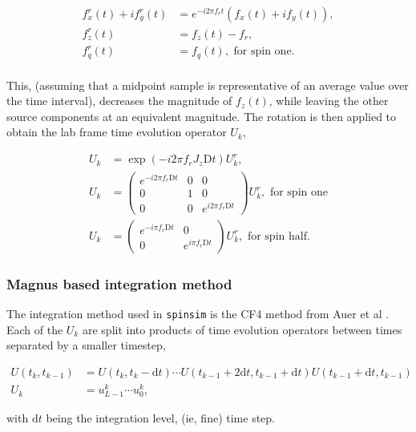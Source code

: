 \documentclass{jors}
\begin{document}
			\begin{align*}
				f^r_x(t) + if^r_y(t) &= e^{-i 2\pi f_r t}(f_x(t) + if_y(t)),\\
				f^r_z(t) &= f_z(t) - f_r,\\
				f^r_q(t) &= f_q(t), \textrm{ for spin one.}\\
			\end{align*}
			
			This, (assuming that a midpoint sample is representative of an average value over the time interval), decreases the magnitude of \(f_z(t)\), while leaving the other source components at an equivalent magnitude. The rotation is then applied to obtain the lab frame time evolution operator \(U_k\),
			
			\begin{align*}
				U_k &= \exp(-i 2 \pi f_r J_z \mathrm{D}t) U^r_k,\\
				U_k &= \begin{pmatrix}
					e^{-i 2\pi f_r \mathrm{D}t} & 0 & 0\\
					0 & 1 & 0\\
					0 & 0 & e^{i 2\pi f_r \mathrm{D}t}
				\end{pmatrix} U^r_k, \textrm{ for spin one}\\
				U_k &= \begin{pmatrix}
					e^{-i \pi f_r \mathrm{D}t} & 0\\
					0 & e^{i \pi f_r \mathrm{D}t}
				\end{pmatrix} U^r_k, \textrm{ for spin half.}
			\end{align*}
			
		\subsubsection*{Magnus based integration method}
			The integration method used in \texttt{spinsim} is the CF4 method from Auer et al \cite{auer_magnus_2018}. Each of the \(U_k\) are split into products of time evolution operators between times separated by a smaller timestep,
			
			\begin{align*}
				U(t_k, t_{k-1}) &= U(t_k, t_k - \mathrm{d}t) \cdots U(t_{k-1} + 2\mathrm{d}t, t_{k-1} + \mathrm{d}t) U(t_{k-1} + \mathrm{d}t, t_{k-1})\\
				U_k &= u^k_{L-1} \cdots u^k_0,
			\end{align*}
			
			with \(\mathrm{d}t\) being the integration level, (ie, fine) time step.
\end{document}
